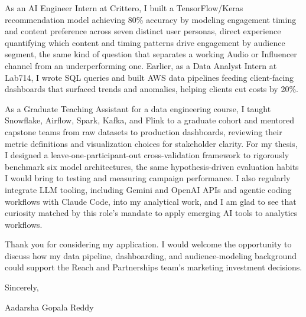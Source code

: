 \documentclass[10pt, letterpaper]{article}
\begin{document}
\vspace{\headerSpacing}
\begin{onecolentry}
	As an AI Engineer Intern at Crittero, I built a TensorFlow/Keras recommendation model achieving 80\% accuracy by modeling engagement timing and content preference across seven distinct user personas, direct experience quantifying which content and timing patterns drive engagement by audience segment, the same kind of question that separates a working Audio or Influencer channel from an underperforming one. Earlier, as a Data Analyst Intern at Lab714, I wrote SQL queries and built AWS data pipelines feeding client-facing dashboards that surfaced trends and anomalies, helping clients cut costs by 20\%.
\end{onecolentry}

\vspace{\headerSpacing}
\begin{onecolentry}
	As a Graduate Teaching Assistant for a data engineering course, I taught Snowflake, Airflow, Spark, Kafka, and Flink to a graduate cohort and mentored capstone teams from raw datasets to production dashboards, reviewing their metric definitions and visualization choices for stakeholder clarity. For my thesis, I designed a leave-one-participant-out cross-validation framework to rigorously benchmark six model architectures, the same hypothesis-driven evaluation habits I would bring to testing and measuring campaign performance. I also regularly integrate LLM tooling, including Gemini and OpenAI APIs and agentic coding workflows with Claude Code, into my analytical work, and I am glad to see that curiosity matched by this role's mandate to apply emerging AI tools to analytics workflows.
\end{onecolentry}

\vspace{\headerSpacing}
\begin{onecolentry}
	Thank you for considering my application. I would welcome the opportunity to discuss how my data pipeline, dashboarding, and audience-modeling background could support the Reach and Partnerships team's marketing investment decisions.
\end{onecolentry}

\vspace{\headerSpacing}
\begin{onecolentry}
	Sincerely,
\end{onecolentry}

\vspace{\headerSpacing}
\begin{onecolentry}
	Aadarsha Gopala Reddy\\
\end{onecolentry}
\end{document}
